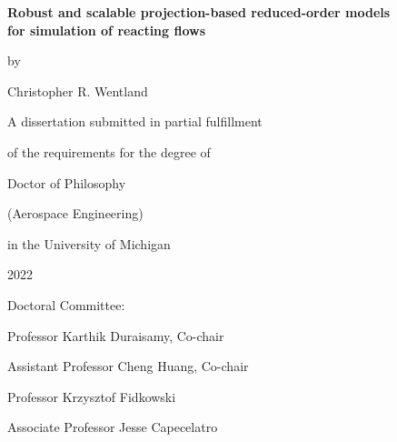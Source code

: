 \thispagestyle{empty}

\begin{singlespace}
\begin{center}

	\textbf{Robust and scalable projection-based reduced-order models \\for simulation of reacting flows}
	
	\vspace{2em}
	
	by
	
	\vspace{2em}
	
    Christopher R. Wentland
	
	\vspace{6em}
	
	A dissertation submitted in partial fulfillment
	
	of the requirements for the degree of
	
	Doctor of Philosophy
	
	(Aerospace Engineering)
	
	in the University of Michigan
	
	2022

\end{center}

\vspace{8em}

Doctoral Committee:

\vspace{1em}

\hspace{3em}Professor Karthik Duraisamy, Co-chair

\hspace{3em}Assistant Professor Cheng Huang, Co-chair

\hspace{3em}Professor Krzysztof Fidkowski

\hspace{3em}Associate Professor Jesse Capecelatro

\end{singlespace}
\restoregeometry
